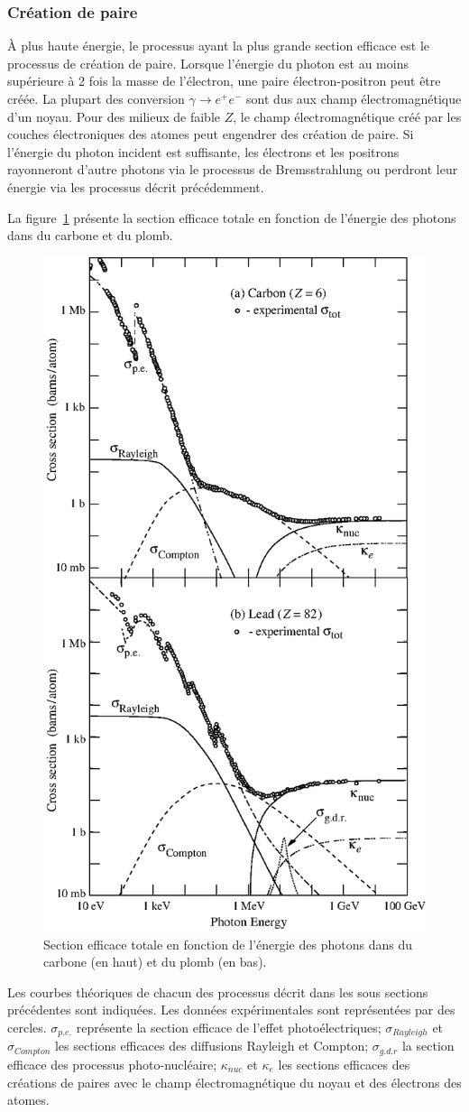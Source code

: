 \subsubsection{Création de paire}
À plus haute énergie, le processus ayant la plus grande section efficace est le processus de création de paire. Lorsque l'énergie du photon est au moins supérieure à 2 fois la masse de l'électron, une paire électron-positron peut être créée. La plupart des conversion $\gamma\rightarrow e^+e^-$ sont dus aux champ électromagnétique d'un noyau. Pour des milieux de faible $Z$, le champ électromagnétique créé par les couches électroniques des atomes peut engendrer des création de paire. Si l'énergie du photon incident est suffisante, les électrons et les positrons rayonneront d'autre photons via le processus de Bremsstrahlung ou perdront leur énergie via les processus décrit précédemment.

La figure~\ref{fig:photon_in_matter} présente la section efficace totale en fonction de l'énergie des photons dans du carbone et du plomb. 
\begin{figure}[!h]
  \begin{center}
    \includegraphics[width=.6\textwidth]{ShowerTh/figs/sigma_both_06.eps}
    \caption{Section efficace totale en fonction de l'énergie des photons dans du carbone (en haut) et du plomb (en bas).}
    \label{fig:photon_in_matter}
  \end{center}
\end{figure}
Les courbes théoriques de chacun des processus décrit dans les sous sections précédentes sont indiquées. Les données expérimentales sont représentées par des cercles. $\sigma_{p.e.}$ représente la section efficace de l'effet photoélectriques; $\sigma_{Rayleigh}$ et $\sigma_{Compton}$ les sections efficaces des diffusions Rayleigh et Compton; $\sigma_{g.d.r}$ la section efficace des processus photo-nucléaire; $\kappa_{nuc}$ et $\kappa_e$ les sections efficaces des créations de paires avec le champ électromagnétique du noyau et des électrons des atomes.


